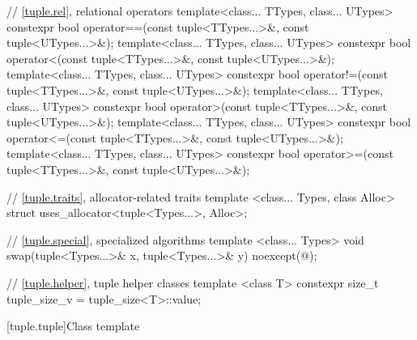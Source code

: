 \begin{codeblock}
{  // \ref{tuple.rel}, relational operators
  template<class... TTypes, class... UTypes>
    constexpr bool operator==(const tuple<TTypes...>&, const tuple<UTypes...>&);
  template<class... TTypes, class... UTypes>
    constexpr bool operator<(const tuple<TTypes...>&, const tuple<UTypes...>&);
  template<class... TTypes, class... UTypes>
    constexpr bool operator!=(const tuple<TTypes...>&, const tuple<UTypes...>&);
  template<class... TTypes, class... UTypes>
    constexpr bool operator>(const tuple<TTypes...>&, const tuple<UTypes...>&);
  template<class... TTypes, class... UTypes>
    constexpr bool operator<=(const tuple<TTypes...>&, const tuple<UTypes...>&);
  template<class... TTypes, class... UTypes>
    constexpr bool operator>=(const tuple<TTypes...>&, const tuple<UTypes...>&);

  // \ref{tuple.traits}, allocator-related traits
  template <class... Types, class Alloc>
    struct uses_allocator<tuple<Types...>, Alloc>;

  // \ref{tuple.special}, specialized algorithms
  template <class... Types>
    void swap(tuple<Types...>& x, tuple<Types...>& y) noexcept(@\seebelow@);

  // \ref{tuple.helper}, tuple helper classes
  template <class T>
    constexpr size_t tuple_size_v = tuple_size<T>::value;
}
\end{codeblock}

[tuple.tuple]{Class template }
%

